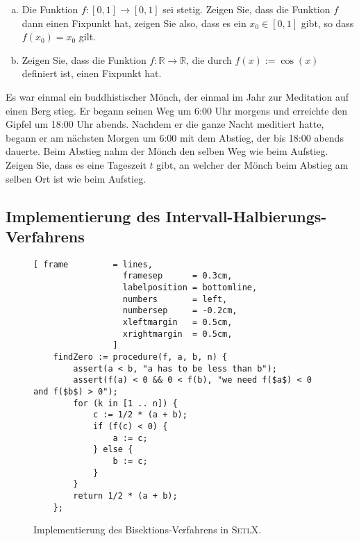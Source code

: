 \exercise
\begin{enumerate}[(a)]
\item Die Funktion $f:[0,1] \rightarrow [0,1]$ sei stetig.  Zeigen Sie, dass die Funktion $f$ dann
      einen Fixpunkt hat, zeigen Sie also, dass es ein $x_0 \in [0,1]$ gibt, so dass
      \\[0.2cm]
      \hspace*{1.3cm}
      $f(x_0) = x_0$ \quad gilt.
\item Zeigen Sie, dass die Funktion $f: \mathbb{R} \rightarrow \mathbb{R}$, die durch $f(x) := \cos(x)$
      definiert ist, einen Fixpunkt hat.  \eox
\end{enumerate}

\exercise
Es war einmal ein buddhistischer M\"onch, der einmal im Jahr zur Meditation auf einen Berg stieg.
Er begann seinen Weg um 6:00 Uhr morgens und erreichte den Gipfel um 18:00 Uhr abends.  Nachdem er
die ganze Nacht meditiert hatte, begann er am n\"achsten Morgen um 6:00 mit dem Abstieg, der bis 18:00
abends dauerte.  Beim Abstieg nahm der M\"onch den selben Weg wie beim Aufstieg.  Zeigen Sie, dass es
eine Tageszeit $t$ gibt, an welcher der M\"onch beim Abstieg am selben Ort ist wie beim Aufstieg. 
\eox
 
\subsection{Implementierung des Intervall-Halbierungs-Verfahrens}

\begin{figure}[!ht]
  \centering
\begin{Verbatim}[ frame         = lines, 
                  framesep      = 0.3cm, 
                  labelposition = bottomline,
                  numbers       = left,
                  numbersep     = -0.2cm,
                  xleftmargin   = 0.5cm,
                  xrightmargin  = 0.5cm,
                ]
    findZero := procedure(f, a, b, n) {
        assert(a < b, "a has to be less than b");   
        assert(f(a) < 0 && 0 < f(b), "we need f($a$) < 0 and f($b$) > 0");
        for (k in [1 .. n]) {
            c := 1/2 * (a + b); 
            if (f(c) < 0) {
                a := c; 
            } else {
                b := c; 
            }
        }
        return 1/2 * (a + b);
    };
\end{Verbatim}
\vspace*{-0.3cm}
  \caption{Implementierung des Bisektions-Verfahrens in \textsc{SetlX}.}
  \label{fig:bisection.setlx}
\end{figure} %

